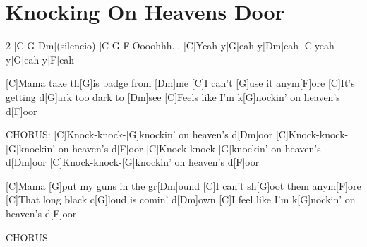 \section{Knocking On Heavens Door}
\begin{guitar}
\begin{multicols}{2}
[C-G-Dm](silencio)
[C-G-F]Oooohhh...
[C]Yeah y[G]eah y[Dm]eah
[C]yeah y[G]eah y[F]eah


[C]Mama take th[G]is badge from [Dm]me
[C]I can't [G]use it anym[F]ore	
[C]It's getting d[G]ark too dark to [Dm]see
[C]Feels like I'm k[G]nockin' on heaven's d[F]oor


CHORUS:
[C]Knock-knock-[G]knockin' on heaven's d[Dm]oor
[C]Knock-knock-[G]knockin' on heaven's d[F]oor
[C]Knock-knock-[G]knockin' on heaven's d[Dm]oor
[C]Knock-knock-[G]knockin' on heaven's d[F]oor


[C]Mama [G]put my guns in the gr[Dm]ound
[C]I can't sh[G]oot them anym[F]ore
[C]That long black c[G]loud is comin' d[Dm]own
[C]I feel like I'm k[G]nockin' on heaven's d[F]oor


CHORUS
%
%
\end{multicols}
\end{guitar}
